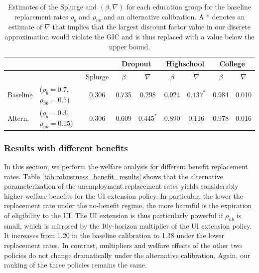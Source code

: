 \documentclass[\econtexRoot/HAFiscal]{subfiles}
\begin{document}
\begin{table}[t]
  \begin{center}
    \begin{tabular}{llc|cccccc} 
      \toprule
      & & & \multicolumn{2}{c}{Dropout} & \multicolumn{2}{c}{Highschool} & \multicolumn{2}{c}{College} \\ \midrule 
      & & Splurge & $\beta$ & $\nabla$ & $\beta$ & $\nabla$ & $\beta$ & $\nabla$ \\ \midrule 
      Baseline & ($\rho_{b}=0.7$, $\rho_{nb}=0.5$) & 0.306 & 0.735 & 0.298 & 0.924 & $0.137^{*}$ & 0.984 & 0.010 \\ 
      Altern. & ($\rho_{b}=0.3$,  $\rho_{nb}=0.15$) & 0.306 & 0.609 & $0.445^{*}$ & 0.890 & 0.116 & 0.978 & 0.016
      \\ \bottomrule 
    \end{tabular}
  \end{center}
  \caption{Estimates of the Splurge and $(\beta,\nabla)$ for each education group for the baseline replacement rates $\rho_{b}$ and $\rho_{nb}$ and an alternative calibration. A $*$ denotes an estimate of $\nabla$ that implies that the largest discount factor value in our discrete approximation would violate the GIC and is thus replaced with a value below the upper bound.}
  \notinsubfile{\label{tab:robustness_benefits}}
\end{table}


\FloatBarrier
\subsubsection{Results with different benefits}
\notinsubfile{\label{sec:robust_benefits_results}}

In this section, we perform the welfare analysis for different benefit replacement rates. Table \ref{tab:robustness_benefit_results} shows that the alternative parameterization of the unemployment replacement rates yields considerably higher welfare benefits for the UI extension policy. In particular, the lower the replacement rate under the no-benefit regime, the more harmful is the expiration of eligibility to the UI. The UI extension is thus particularly powerful if $\rho_{nb}$ is small, which is mirrored by the 10y-horizon multiplier of the UI extension policy. It increases from 1.20 in the baseline calibration to 1.38 under the lower replacement rates. In contrast, multipliers and welfare effects of the other two policies do not change dramatically under the alternative calibration. Again, our ranking of the three policies remains the same.
\end{document}
